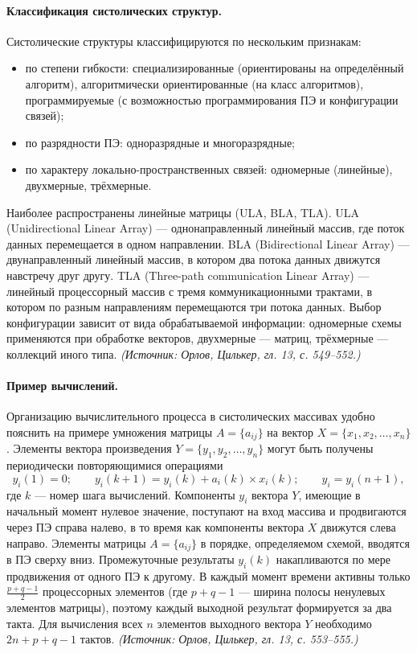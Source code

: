 \documentclass[a4paper,12pt]{article}
\begin{document}
\paragraph{Классификация систолических структур.}
Систолические структуры классифицируются по нескольким признакам:
\begin{itemize}
\item по степени гибкости: специализированные (ориентированы на определённый алгоритм), алгоритмически ориентированные (на класс алгоритмов), программируемые (с возможностью программирования ПЭ и конфигурации связей);
\item по разрядности ПЭ: одноразрядные и многоразрядные;
\item по характеру локально-пространственных связей: одномерные (линейные), двухмерные, трёхмерные.
\end{itemize}
Наиболее распространены линейные матрицы (ULA, BLA, TLA). ULA (Unidirectional Linear Array) — однонаправленный линейный массив, где поток данных перемещается в одном направлении. BLA (Bidirectional Linear Array) — двунаправленный линейный массив, в котором два потока данных движутся навстречу друг другу. TLA (Three-path communication Linear Array) — линейный процессорный массив с тремя коммуникационными трактами, в котором по разным направлениям перемещаются три потока данных. Выбор конфигурации зависит от вида обрабатываемой информации: одномерные схемы применяются при обработке векторов, двухмерные — матриц, трёхмерные — коллекций иного типа.
\textit{(Источник: Орлов, Цилькер, гл. 13, с. 549--552.)}

\paragraph{Пример вычислений.}
Организацию вычислительного процесса в систолических массивах удобно пояснить на примере умножения матрицы \(A=\{a_{ij}\}\) на вектор \(X=\{x_1,x_2,\ldots,x_n\}\). Элементы вектора произведения \(Y=\{y_1,y_2,\ldots,y_n\}\) могут быть получены периодически повторяющимися операциями
\[
y_i(1)=0;\qquad y_i(k+1)=y_i(k)+a_i(k)\times x_i(k);\qquad y_i=y_i(n+1),
\]
где \(k\) — номер шага вычислений. Компоненты \(y_i\) вектора \(Y\), имеющие в начальный момент нулевое значение, поступают на вход массива и продвигаются через ПЭ справа налево, в то время как компоненты вектора \(X\) движутся слева направо. Элементы матрицы \(A=\{a_{ij}\}\) в порядке, определяемом схемой, вводятся в ПЭ сверху вниз. Промежуточные результаты \(y_i(k)\) накапливаются по мере продвижения от одного ПЭ к другому. В каждый момент времени активны только \(\frac{p+q-1}{2}\) процессорных элементов (где \(p+q-1\) — ширина полосы ненулевых элементов матрицы), поэтому каждый выходной результат формируется за два такта. Для вычисления всех \(n\) элементов выходного вектора \(Y\) необходимо \(2n+p+q-1\) тактов.
\textit{(Источник: Орлов, Цилькер, гл. 13, с. 553--555.)}
\end{document}
